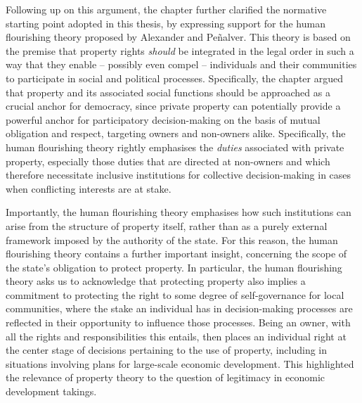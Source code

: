 Following up on this argument, the chapter further clarified the normative starting point adopted in this thesis, by expressing support for the human flourishing theory proposed by Alexander and Pe\~{n}alver. This theory is based on the premise that property rights {\it should} be integrated in the legal order in such a way that they enable -- possibly even compel -- individuals and their communities to participate in social and political processes. Specifically, the chapter argued that property and its associated social functions should be approached as a crucial anchor for democracy, since private property can potentially provide a powerful anchor for participatory decision-making on the basis of mutual obligation and respect, targeting owners and non-owners alike. Specifically, the human flourishing theory rightly emphasises the {\it duties} associated with private property, especially those duties that are directed at non-owners and which therefore necessitate inclusive institutions for collective decision-making in cases when conflicting interests are at stake.

Importantly, the human flourishing theory emphasises how such institutions can arise from the structure of property itself, rather than as a purely external framework imposed by the authority of the state. For this reason, the human flourishing theory contains a further important insight, concerning the scope of the state's obligation to protect property. In particular, the human flourishing theory asks us to acknowledge that protecting property also implies a commitment to protecting the right to some degree of self-governance for local communities, where the stake an individual has in decision-making processes are reflected in their opportunity to influence those processes. Being an owner, with all the rights and responsibilities this entails, then places an individual right at the center stage of decisions pertaining to the use of property, including in situations involving plans for large-scale economic development. This highlighted the relevance of property theory to the question of legitimacy in economic development takings.

